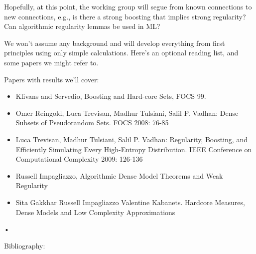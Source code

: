 Hopefully, at this point, the working group will segue from known connections to new connections, e.g., is there a strong boosting that implies strong regularity? Can algorithmic regularity lemmas be used in ML?

We won't assume any background and will develop everything from first principles using only simple calculations. Here's an optional reading list, and some papers we might refer to.

Papers with results we'll cover:

\begin{itemize}
\item
Klivans and Servedio, Boosting and Hard-core Sets, FOCS 99.
\item
Omer Reingold, Luca Trevisan, Madhur Tulsiani, Salil P. Vadhan: Dense Subsets of Pseudorandom Sets. FOCS 2008: 76-85
\item
Luca Trevisan, Madhur Tulsiani, Salil P. Vadhan: Regularity, Boosting, and Efficiently Simulating Every High-Entropy Distribution. IEEE Conference on Computational Complexity 2009: 126-136
\item
Russell Impagliazzo, Algorithmic Dense Model Theorems and Weak Regularity
\item
Sita Gakkhar Russell Impagliazzo Valentine Kabanets. Hardcore Measures, Dense Models and Low Complexity Approximations
\end{itemize}•

Bibliography:

